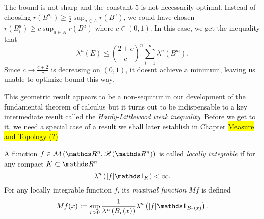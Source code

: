 \begin{rem*}
	The bound is not sharp and the constant 5 is not necessarily optimal. Instead of choosing $r(B^{a_i}) \geq \frac{1}{2}\sup_{a\in A} r(B^a)$, we could have chosen $r(B^a_i) \geq c\sup_{a\in A} r(B^a)$ where $c \in (0,1)$. In this case, we get the inequality that
	\[
	 	\lambda^n (E) \leq \left(\frac{2+c}{c}\right)^n \sum_{i=1}^\infty \lambda^n \left( B^{a_i} \right).
	\]
	Since $c \to \frac{c+2}{c}$ is decreasing on $(0,1)$, it doesnt achieve a minimum, leaving us unable to optimize bound this way.
\end{rem*}

This geometric result appears to be a non-sequitur in our development of the fundamental theorem of calculus but it turns out to be indispensable to a key intermediate result
called the \emph{Hardy-Littlewood weak inequality}. Before we get to it, we need a special case of a result we shall later establish in Chapter \hl{Measure and Topology (?)}


\begin{defn}
\label{def:maximalFunction} A function $f \in \mathcal{M}\left(\R^n, \borel \left( \R^n \right) \right) $ is called \emph{locally integrable} if for any compact 
$K \subset \R^n$
\[
    \lambda^n \left( \lvert f \rvert \indicate_K \right) < \infty. 
\]
For any locally integrable function $f$, its \emph{maximal function} $Mf$ is defined 
\[
Mf(x) := \sup_{r > 0} \frac{1}{\lambda^n \left(B_r(x)\right) } \lambda^n \left( \lvert f \rvert \indicate_{B_r(x)} \right).
\] 
\end{defn}

